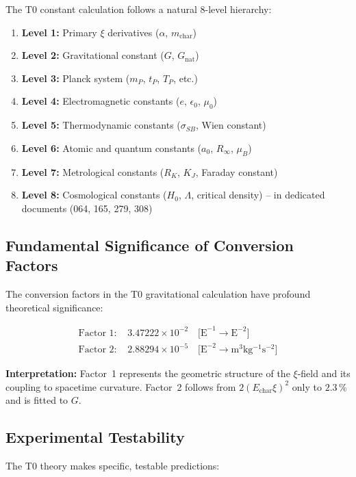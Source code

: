 	The T0 constant calculation follows a natural 8-level hierarchy:
	
	\begin{enumerate}
		\item \textbf{Level 1:} Primary $\xi$ derivatives ($\alpha$, $m_{\text{char}}$)
		\item \textbf{Level 2:} Gravitational constant ($G$, $G_{\text{nat}}$)
		\item \textbf{Level 3:} Planck system ($m_P$, $t_P$, $T_P$, etc.)
		\item \textbf{Level 4:} Electromagnetic constants ($e$, $\epsilon_0$, $\mu_0$)
		\item \textbf{Level 5:} Thermodynamic constants ($\sigma_{SB}$, Wien constant)
		\item \textbf{Level 6:} Atomic and quantum constants ($a_0$, $R_\infty$, $\mu_B$)
		\item \textbf{Level 7:} Metrological constants ($R_K$, $K_J$, Faraday constant)
		\item \textbf{Level 8:} Cosmological constants ($H_0$, $\Lambda$, critical density) -- in dedicated documents (064, 165, 279, 308)
	\end{enumerate}
	
	\subsection{Fundamental Significance of Conversion Factors}
	
	The conversion factors in the T0 gravitational calculation have profound theoretical significance:
	
	\begin{align}
		\text{Factor 1: } &3.47222 \times 10^{-2} \quad \text{[E}^{-1} \rightarrow \text{E}^{-2}\text{]} \\
		\text{Factor 2: } &2.88294 \times 10^{-5} \quad \text{[E}^{-2} \rightarrow \si{\meter^3 \kilogram^{-1} \second^{-2}}\text{]}
	\end{align}
	
	\textbf{Interpretation:} Factor~1 represents the geometric structure of the $\xi$-field and its coupling to spacetime curvature. Factor~2 follows from $2(E_{\text{char}}\xi)^2$ only to $2.3\,\%$ and is fitted to $G$.
	
	\subsection{Experimental Testability}
	
	The T0 theory makes specific, testable predictions:
	
